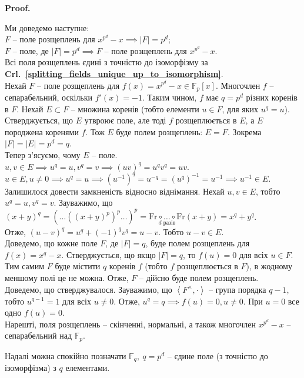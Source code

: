 \documentclass[a4paper, 10pt]{article}
\makeatletter
\theoremstyle{theoremdd}
\theoremstyle{theoremdd}
\theoremstyle{theoremdd}
\theoremstyle{theoremdd}
\theoremstyle{theoremdd}
\theoremstyle{theoremdd}
\theoremstyle{theoremdd}
\theoremstyle{theoremdd}
\theoremstyle{theoremdd}
\theoremstyle{theoremdd}
\theoremstyle{theoremdd}
\theoremstyle{theoremdd}
\theoremstyle{theoremdd}
\theoremstyle{theoremdd}
\theoremstyle{theoremdd}
\renewenvironment{proof}[1][Proof.\\]{\par
\pushQED{\hfill \qed}%
\normalfont \topsep6\p@\@plus6\p@\relax
\trivlist
\item\relax
{\bfseries
#1\@addpunct{.}}\hspace\labelsep\ignorespaces
}{%
\popQED\endtrivlist\@endpefalse
}
\newcommand\crlref[1]{\textbf{Crl.~\ref{#1}}}
\makeatother
\begin{document}
\begin{proof}
Ми доведемо наступне:\\
$F$ -- поле розщеплень для $x^{p^d} - x \implies |F| = p^d$;\\
$F$ -- поле, де $|F| = p^d \implies F$ -- поле розщеплень для $x^{p^d} - x$.\\
Всі поля розщеплень єдині з точністю до ізоморфізму за \crlref{splitting_fields_unique_up_to_isomorphism}.\\
Нехай $F$ -- поле розщеплень для $f(x) = x^{p^d} - x \in \mathbb{F}_p[x]$. Многочлен $f$ -- сепарабельний, оскільки $f'(x) = -1$. Таким чином, $f$ має $q = p^d$ різних коренів в $F$. Нехай $E \subset F$ -- множина коренів (тобто елементи $u \in F$, для яких $u^q = u$). Стверджується, що $E$ утвроює поле, але тоді $f$  розщеплюється в $E$, а $E$ породжена коренями $f$. Тож $E$ буде полем розщеплень: $E = F$. Зокрема $|F| = |E| = p^d = q$.\\
Тепер з'ясуємо, чому $E$ -- поле.\\
$u,v \in E \implies u^q = u, v^q = v \implies (uv)^q = u^q v^q = uv$.\\
$u \in E, u \neq 0 \implies u^q = u \implies (u^{-1})^q = u^{-q} = (u^q)^{-1} = u^{-1} \implies u^{-1} \in E$.\\
Залишилося довести замкненість відносно віднімання. Нехай $u,v \in E$, тобто $u^q = u, v^q = v$. Зауважимо, що $(x+y)^q = ( \dots ((x+y)^p)^p \dots )^p = \underset{d \text{ разів}}{\text{Fr} \circ \dots \circ \text{Fr}}(x+y) = x^q + y^q$.\\
Отже, $(u-v)^q = u^q + (-1)^q v^q = u-v$. Тобто $u-v \in E$.
\bigskip \\
Доведемо, що кожне поле $F$, де $|F| = q$, буде полем розщеплень для $f(x) = x^q - x$. Стверджується, що якщо $|F| = q$, то $f(u) = 0$ для всіх $u \in F$. Тим самим $F$ буде містити $q$ коренів $f$ (тобто $f$ розщеплюється в $F$), в жодному меншому полі це не можна. Отже, $F$ -- дійсно буде полем розщеплень.\\
Доведемо, що стверджувалося. Зауважимо, що $\left<F^\times, \cdot \right>$ -- група порядка $q-1$, тобто $u^{q-1} = 1$ для всіх $u \neq 0$. Отже, $u^q = q \implies f(u) = 0, u \neq 0$. При $u = 0$ все одно $f(u) = 0$.\\
Нарешті, поля розщеплень -- скінченні, нормальні, а також многочлен $x^{p^d} - x$ -- сепарабельний над $\mathbb{F}_p$.
\end{proof}

Надалі можна спокійно позначати $\mathbb{F}_q,\ q = p^d$ -- єдине поле (з точністю до ізоморфізма) з $q$ елементами.
\end{document}
